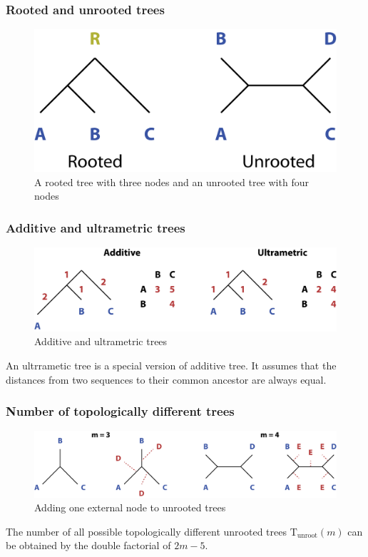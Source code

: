 %
%
\subsubsection*{Rooted and unrooted trees}
\begin{figure}[H]
  \centering
      \includegraphics[width=0.35 \textwidth]{fig09/root_unroot_trees.png}
  \caption{A rooted tree with three nodes and an unrooted tree with four nodes}
\end{figure}

%
%
\subsubsection*{Additive and ultrametric trees}
\begin{figure}[H]
  \centering
      \includegraphics[width=0.6 \textwidth]{fig09/additive_ultrametric.png}
  \caption{Additive and ultrametric trees}
\end{figure}
An ultrrametic tree is a special version of additive tree. It assumes that the distances from two sequences to their common ancestor are always equal.

%
%
\subsubsection*{Number of topologically different trees}
\begin{figure}[H]
  \centering
      \includegraphics[width=0.7 \textwidth]{fig09/unroot_topology.png}
  \caption{Adding one external node to unrooted trees}
\end{figure}

The number of all possible topologically different unrooted trees $\mathrm{T_{unroot}}(m)$ can be obtained by the double factorial of $2m-5$.

